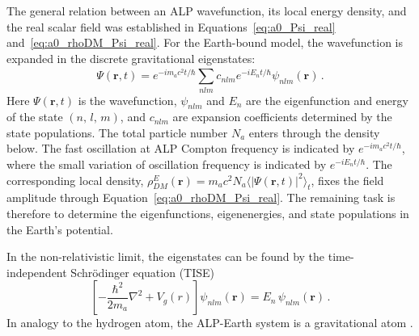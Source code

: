 The general relation between an ALP wavefunction, its local energy density, and the real scalar field was established in Equations~\eqref{eq:a0_Psi_real} and~\eqref{eq:a0_rhoDM_Psi_real}.
For the Earth-bound model, the wavefunction is expanded in the discrete gravitational eigenstates:
\begin{equation}
    \Psi(\mathbf{r}, t) = e^{-i m_a c^2 t / \hbar}\sum_{nlm}^{} c_{nlm} e^{-i E_n t / \hbar} \psi_{nlm}(\mathbf{r})\,.
    \label{eq:Psi_r_t}
\end{equation}
Here $\Psi(\mathbf{r}, t)$ is the wavefunction, $\psi_{nlm}$ and $E_n$ are the eigenfunction and energy of the state $(n,\,l,\,m)$, and $c_{nlm}$ are expansion coefficients determined by the state populations.
The total particle number $N_a$ enters through the density below.
The fast oscillation at ALP Compton frequency is indicated by $e^{-i m_a c^2 t / \hbar}$, where the small variation of oscillation frequency is indicated by $e^{-i E_n t / \hbar}$.
The corresponding local density, $\rho_{DM}^{E}(\mathbf{r})=m_a c^2N_a
\langle|\Psi(\mathbf{r},t)|^2\rangle_t$, fixes the field amplitude through
Equation~\eqref{eq:a0_rhoDM_Psi_real}.
The remaining task is therefore to determine the eigenfunctions, eigenenergies, and state populations in the Earth's potential.

In the non-relativistic limit, the eigenstates can be found by the time-independent Schrödinger equation (TISE)
\begin{equation}
    \left[-\frac{\hbar^2}{2 m_a}\nabla^2 + V_g(r)\right]\psi_{nlm}(\mathbf{r})
    = E_n\,\psi_{nlm}(\mathbf{r})
    \,.\label{eq:schrodinger_earth}
\end{equation}
In analogy to the hydrogen atom, the ALP-Earth system is a gravitational atom .


